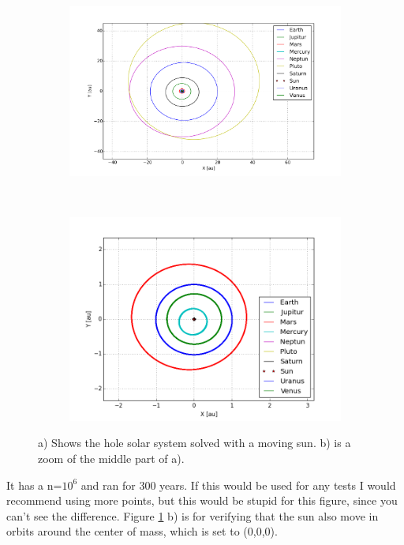 \begin{figure}[H]
    \centering
    \begin{subfigure}{0.5\textwidth}
        \centering
        \includegraphics[width=\linewidth]{result/bilder/all-moving-solarsystem.png}
        \caption{}
    \end{subfigure}%
    ~ 
    \begin{subfigure}{0.5\textwidth}
        \centering
        \includegraphics[width=\linewidth]{result/bilder/all-moving-solarsystem-zoom.png}
        \caption{}
    \end{subfigure}
    \caption{a) Shows the hole solar system solved with a moving sun.  b) is a zoom of the middle part of a). }
    \label{fig:solarsystem-moving}
\end{figure}

It has a n=$10^6$ and ran for 300 years. If this would be used for any tests I would recommend using more points, but this would be stupid for this figure, since you can't see the difference. Figure \ref{fig:solarsystem-moving} b) is for verifying that the sun also move in orbits around the center of mass, which is set to (0,0,0).




